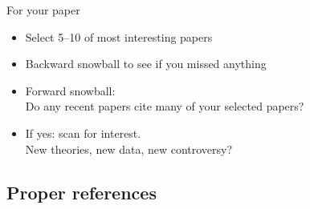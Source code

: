 \documentclass[%
	shownavigationbar=	false,%
	showsidebar= 		false,%
	fleqn,%
	xcolor=			{usenames, svgnames},%
	usepdftitle=			false,%
]{beamer}
\begin{document}
\begin{frame}[plain]
\end{frame}

\begin{frame}
\begin{block}{For your paper}
\begin{itemize}
	\item Select 5--10 of most interesting papers
	\item Backward snowball to see if you missed anything
	\item Forward snowball: \\
	Do any recent papers cite many of your selected papers?
	\item If yes: scan for interest. \\
	New theories, new data, new controversy?
\end{itemize}
\end{block}
\end{frame}


\subsection{Proper references}
\end{document}

